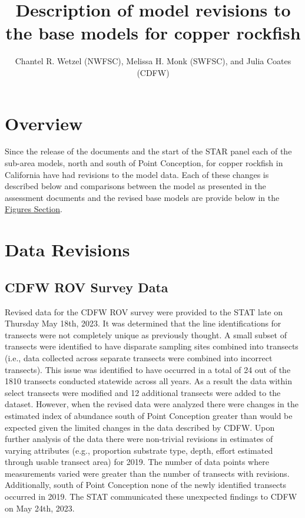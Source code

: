 \documentclass[
  letterpaper,
]{article}
\title{Description of model revisions to the base models for copper rockfish}
\author{Chantel R. Wetzel (NWFSC), Melissa H. Monk (SWFSC), and Julia Coates (CDFW)}
\date{}
\begin{document}
\maketitle

{
\setcounter{tocdepth}{2}
\tableofcontents
}
\hypertarget{overview}{%
\section{Overview}\label{overview}}

Since the release of the documents and the start of the STAR panel each of the sub-area models, north and south of Point Conception, for copper rockfish in California have had revisions to the model data. Each of these changes is described below and comparisons between the model as presented in the assessment documents and the revised base models are provide below in the \protect\hyperlink{figures}{Figures Section}.

\hypertarget{data-revisions}{%
\section{Data Revisions}\label{data-revisions}}

\hypertarget{cdfw-rov-survey-data}{%
\subsection{CDFW ROV Survey Data}\label{cdfw-rov-survey-data}}

Revised data for the CDFW ROV survey were provided to the STAT late on Thursday May 18th, 2023. It was determined that the line identifications for transects were not completely unique as previously thought. A small subset of transects were identified to have disparate sampling sites combined into transects (i.e., data collected across separate transects were combined into incorrect transects). This issue was identified to have occurred in a total of 24 out of the 1810 transects conducted statewide across all years. As a result the data within select transects were modified and 12 additional transects were added to the dataset. However, when the revised data were analyzed there were changes in the estimated index of abundance south of Point Conception greater than would be expected given the limited changes in the data described by CDFW. Upon further analysis of the data there were non-trivial revisions in estimates of varying attributes (e.g., proportion substrate type, depth, effort estimated through usable transect area) for 2019. The number of data points where measurements varied were greater than the number of transects with revisions. Additionally, south of Point Conception none of the newly identified transects occurred in 2019. The STAT communicated these unexpected findings to CDFW on May 24th, 2023.
\end{document}
